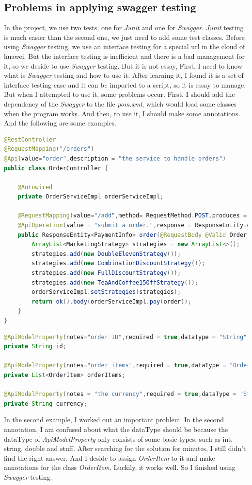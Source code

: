 \documentclass[a4paper]{report}
\begin{document}
\subsection{Problems in applying swagger testing}
\par In the project, we use two tests, one for \emph{Junit} and one for \emph{Swagger}. \emph{Junit} testing is much easier than the second one, we just need to add some test classes. Before using \emph{Swagger} testing, we use an interface testing for a special url in the cloud of huawei. But the interface testing is inefficient and there is a bad management for it, so we deside to use \emph{Swagger} testing. But it is not essay, First, I need to know what is \emph{Swagger} testing and how to use it. After learning it, I found it is a set of interface testing case and it can be imported to a script, so it is essay to manage. But when I attempted to use it, some problems occur. First, I should add the dependency of the \emph{Swagger} to the file \emph{pom.xml}, which would load some classes when the program works. And then, to use it, I should make some annotations. And the following are some examples.
\begin{lstlisting}[language=java]
@RestController
@RequestMapping("/orders")
@Api(value="order",description = "the service to handle orders")
public class OrderController {

    @Autowired
    private OrderServiceImpl orderServiceImpl;

    @RequestMapping(value="/add",method= RequestMethod.POST,produces = "application/json")
    @ApiOperation(value = "submit a order.",response = ResponseEntity.class)
    public ResponseEntity<PaymentInfo> order(@RequestBody @Valid Order order) {
        ArrayList<MarketingStrategy> strategies = new ArrayList<>();
        strategies.add(new DoubleElevenStrategy());
        strategies.add(new CombinationDiscountStrategy());
        strategies.add(new FullDiscountStrategy());
        strategies.add(new TeaAndCoffee15OffStrategy());
        orderServiceImpl.setStrategies(strategies);
        return ok().body(orderServiceImpl.pay(order));
    }
}
\end{lstlisting}
\begin{lstlisting}[language=java]
@ApiModelProperty(notes="order ID",required = true,dataType = "String")
private String id;

@ApiModelProperty(notes="order items",required = true,dataType = "OrderItem")
private List<OrderItem> orderItems;

@ApiModelProperty(notes = "the currency",required = true,dataType = "String")
private String currency;
\end{lstlisting}
\par In the second example, I worked out an important problem. In the second annotation, I am confused about what the dataType should be because the dataType of \emph{ApiModelProperty} only consists of some basic types, such as int, string, double and stuff. After searching for the solution for minutes, I still didn't find the right answer. And I deside to assign \emph{OrderItem} to it and make annotations for the class \emph{OrderItem}. Luckily, it works well. So I finished using \emph{Swagger} testing.
\end{document}
